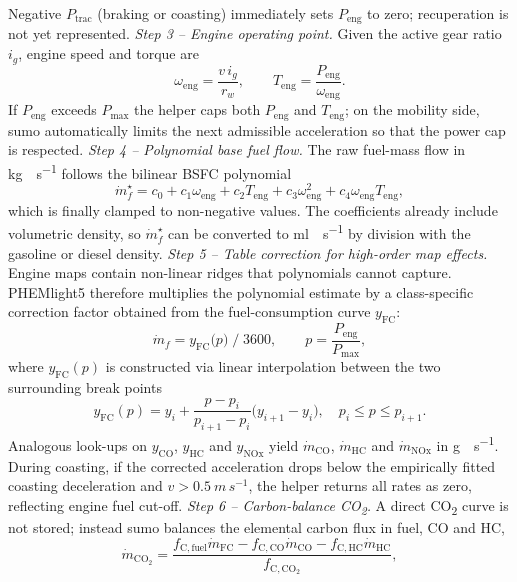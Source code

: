 Negative $P_{\mathrm{trac}}$ (braking or coasting) immediately sets $P_{\mathrm{eng}}$ to zero; recuperation is not yet represented.
\mynewline
\textit{Step 3 – Engine operating point.}  
Given the active gear ratio $i_{g}$, engine speed and torque are
\[
  \omega_{\mathrm{eng}}=\frac{v\,i_{g}}{r_{w}},\qquad
  T_{\mathrm{eng}}=\frac{P_{\mathrm{eng}}}{\omega_{\mathrm{eng}}}.
\]
If $P_{\mathrm{eng}}$ exceeds $P_{\max}$ the helper caps both $P_{\mathrm{eng}}$ and $T_{\mathrm{eng}}$; on the mobility side, \ac{sumo} automatically limits the next admissible acceleration so that the power cap is respected.
\mynewline
\textit{Step 4 – Polynomial base fuel flow.}  
The raw fuel-mass flow in \si{\kilogram\;s^{-1}} follows the bilinear BSFC polynomial
\[
  \boxed{\dot m_{f}^{\star}=c_{0}+c_{1}\omega_{\mathrm{eng}}
          +c_{2}T_{\mathrm{eng}}
          +c_{3}\omega_{\mathrm{eng}}^{2}
          +c_{4}\omega_{\mathrm{eng}}T_{\mathrm{eng}}},
\]
which is finally clamped to non-negative values.  The coefficients already include volumetric density, so \(\dot m_{f}^{\star}\) can be converted to \si{\milli\litre\;s^{-1}} by division with the gasoline or diesel density.
\mynewline
\textit{Step 5 – Table correction for high-order map effects.}  
Engine maps contain non-linear ridges that polynomials cannot capture.  PHEMlight5 therefore multiplies the polynomial estimate by a class-specific correction factor obtained from the fuel-consumption curve $y_{\mathrm{FC}}$:
\[
  \dot m_{f}=
  y_{\mathrm{FC}}\!\bigl(p\bigr)\;/\;3600,
  \qquad p=\frac{P_{\mathrm{eng}}}{P_{\max}},
\]
where $y_{\mathrm{FC}}(p)$ is constructed via linear interpolation between the two surrounding break points
\[
  y_{\mathrm{FC}}(p)=
  y_{i}+\frac{p-p_{i}}{p_{i+1}-p_{i}}\bigl(y_{i+1}-y_{i}\bigr),
  \quad p_{i}\le p\le p_{i+1}.
\]
Analogous look-ups on $y_{\mathrm{CO}}$, $y_{\mathrm{HC}}$ and $y_{\mathrm{NOx}}$ yield \(\dot m_{\mathrm{CO}}\), \(\dot m_{\mathrm{HC}}\) and \(\dot m_{\mathrm{NOx}}\) in \si{\gram\;s^{-1}}.  During coasting, if the corrected acceleration drops below the empirically fitted coasting deceleration and \(v>\SI{0.5}{m\,s^{-1}}\), the helper returns all rates as zero, reflecting engine fuel cut-off.
\mynewline
\textit{Step 6 – Carbon-balance CO\textsubscript{2}.}  
A direct CO\textsubscript{2} curve is not stored; instead \ac{sumo} balances the elemental carbon flux in fuel, CO and HC,
\[
  \boxed{\dot m_{\mathrm{CO_2}}
  =\frac{f_{\mathrm{C,fuel}}\dot m_{\mathrm{FC}}
        -f_{\mathrm{C,CO}}\dot m_{\mathrm{CO}}
        -f_{\mathrm{C,HC}}\dot m_{\mathrm{HC}}}
       {f_{\mathrm{C,CO_2}}}},
\]
